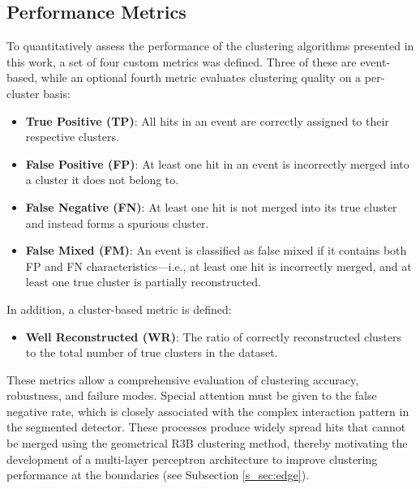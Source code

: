 \documentclass[final,5p,times,twocolumn]{elsarticle}
\begin{document}
\subsection{Performance Metrics}\label{s_sec:metrics}
To quantitatively assess the performance of the clustering algorithms presented in this work, a set of four custom metrics was defined. Three of these are event-based, while an optional fourth metric evaluates clustering quality on a per-cluster basis:
\begin{itemize}
    \item \textbf{True Positive (TP)}: All hits in an event are correctly assigned to their respective clusters.
    \item \textbf{False Positive (FP)}: At least one hit in an event is incorrectly merged into a cluster it does not belong to.
    \item \textbf{False Negative (FN)}: At least one hit is not merged into its true cluster and instead forms a spurious cluster.
    \item \textbf{False Mixed (FM)}: An event is classified as false mixed if it contains both FP and FN characteristics—i.e., at least one hit is incorrectly merged, and at least one true cluster is partially reconstructed.
\end{itemize}
In addition, a cluster-based metric is defined:
\begin{itemize}
    \item \textbf{Well Reconstructed (WR)}: The ratio of correctly reconstructed clusters to the total number of true clusters in the dataset.
\end{itemize}
These metrics allow a comprehensive evaluation of clustering accuracy, robustness, and failure modes.\newline
Special attention must be given to the false negative rate, which is closely associated with the complex interaction pattern in the segmented detector. These processes produce widely spread hits that cannot be merged using the geometrical R3B clustering method, thereby motivating the development of a multi-layer perceptron architecture to improve clustering performance at the boundaries (see Subsection \ref{s_sec:edge}).\newline
\end{document}
